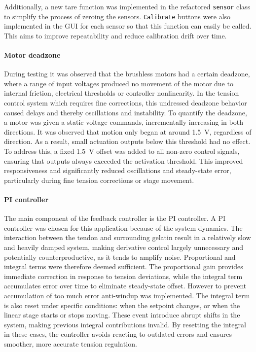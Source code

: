Additionally, a new tare function was implemented in the refactored \texttt{sensor} class to simplify the process of zeroing the sensors. \texttt{Calibrate} buttons were also implemented in the GUI for each sensor so that this function can easily be called. This aims to improve repeatability and reduce calibration drift over time.

\paragraph*{Motor deadzone}
During testing it was observed that the brushless motors had a certain deadzone, where a range of input voltages produced no movement of the motor due to internal friction, electrical thresholds or controller nonlinearity. In the tension control system which requires fine corrections, this undressed deadzone behavior caused delays and thereby oscillations and instability.
\newline \newline 
To quantify the deadzone, a motor was given a static voltage commands, incrementally increasing in both directions. It was observed that motion only began at around \SI{1.5}{\volt}, regardless of direction. As a result, small actuation outputs below this threshold had no effect.
\newline \newline
To address this, a fixed \SI{1.5}{\volt} offset was added to all non-zero control signals, ensuring that outputs always exceeded the activation threshold. This improved responsiveness and significantly reduced oscillations and steady-state error, particularly during fine tension corrections or stage movement.

\paragraph*{PI controller}
The main component of the feedback controller is the PI controller. A PI controller was chosen for this application because of the system dynamics. The interaction between the tendon and surrounding gelatin result in a relatively slow and heavily damped system, making derivative control largely unnecessary and potentially counterproductive, as it tends to amplify noise. Proportional and integral terms were therefore deemed sufficient. 
\newline \newline
The proportional gain provides immediate correction in response to tension deviations, while the integral term accumulates error over time to eliminate steady-state offset. However to prevent accumulation of too much error anti-windup was implemented. The integral term is also reset under specific conditions: when the setpoint changes, or when the linear stage starts or stops moving. These event introduce abrupt shifts in the system, making previous integral contributions invalid. By resetting the integral in these cases, the controller avoids reacting to outdated errors and ensures smoother, more accurate tension regulation. 

